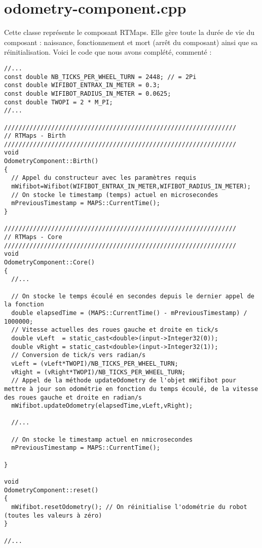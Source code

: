 \documentclass[11pt,a4paper,oneside,french,svgnames]{report}
\newcommand{\cpp}{\lstset{
  language=C++,
  title={{\setlength{\fboxsep}{1pt}\fcolorbox{orange}{yellow!20}{\sffamily\scriptsize
              \textcolor{gray!10}{\_}C++\textcolor{gray!10}{\_}}}}
  }
}
\begin{document}
\section{odometry-component.cpp}
Cette classe représente le composant RTMaps. Elle gère toute la durée de vie du composant : naissance, fonctionnement et mort (arrêt du composant) ainsi que sa réinitialisation.
Voici le code que nous avons complété, commenté :
\cpp
\begin{lstlisting}
//...
const double NB_TICKS_PER_WHEEL_TURN = 2448; // = 2Pi
const double WIFIBOT_ENTRAX_IN_METER = 0.3;
const double WIFIBOT_RADIUS_IN_METER = 0.0625;
const double TWOPI = 2 * M_PI;
//...

////////////////////////////////////////////////////////////////
// RTMaps - Birth
////////////////////////////////////////////////////////////////
void
OdometryComponent::Birth()
{
  // Appel du constructeur avec les paramètres requis
  mWifibot=Wifibot(WIFIBOT_ENTRAX_IN_METER,WIFIBOT_RADIUS_IN_METER);
  // On stocke le timestamp (temps) actuel en microsecondes
  mPreviousTimestamp = MAPS::CurrentTime();
}

////////////////////////////////////////////////////////////////
// RTMaps - Core
////////////////////////////////////////////////////////////////
void
OdometryComponent::Core() 
{
  //...

  // On stocke le temps écoulé en secondes depuis le dernier appel de la fonction
  double elapsedTime = (MAPS::CurrentTime() - mPreviousTimestamp) / 1000000;
  // Vitesse actuelles des roues gauche et droite en tick/s
  double vLeft  = static_cast<double>(input->Integer32(0));
  double vRight = static_cast<double>(input->Integer32(1));
  // Conversion de tick/s vers radian/s
  vLeft = (vLeft*TWOPI)/NB_TICKS_PER_WHEEL_TURN;
  vRight = (vRight*TWOPI)/NB_TICKS_PER_WHEEL_TURN;
  // Appel de la méthode updateOdometry de l'objet mWifibot pour mettre à jour son odométrie en fonction du temps écoulé, de la vitesse des roues gauche et droite en radian/s
  mWifibot.updateOdometry(elapsedTime,vLeft,vRight);

  //...

  // On stocke le timestamp actuel en nmicrosecondes
  mPreviousTimestamp = MAPS::CurrentTime();

}

void
OdometryComponent::reset()
{
  mWifibot.resetOdometry(); // On réinitialise l'odométrie du robot (toutes les valeurs à zéro)
}

//...
\end{lstlisting}
\end{document}

